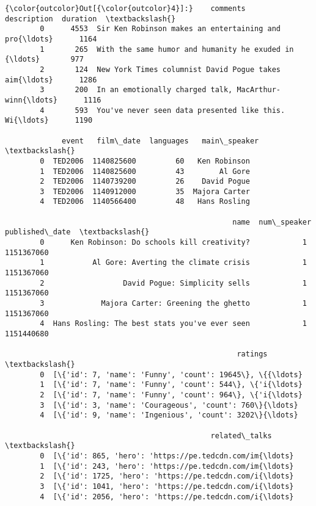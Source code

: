 \documentclass[11pt]{article}
\begin{document}
\begin{Verbatim}[commandchars=\\\{\}]
{\color{outcolor}Out[{\color{outcolor}4}]:}    comments                                        description  duration  \textbackslash{}
        0      4553  Sir Ken Robinson makes an entertaining and pro{\ldots}      1164   
        1       265  With the same humor and humanity he exuded in {\ldots}       977   
        2       124  New York Times columnist David Pogue takes aim{\ldots}      1286   
        3       200  In an emotionally charged talk, MacArthur-winn{\ldots}      1116   
        4       593  You've never seen data presented like this. Wi{\ldots}      1190   
        
             event   film\_date  languages   main\_speaker  \textbackslash{}
        0  TED2006  1140825600         60   Ken Robinson   
        1  TED2006  1140825600         43        Al Gore   
        2  TED2006  1140739200         26    David Pogue   
        3  TED2006  1140912000         35  Majora Carter   
        4  TED2006  1140566400         48   Hans Rosling   
        
                                                    name  num\_speaker  published\_date  \textbackslash{}
        0      Ken Robinson: Do schools kill creativity?            1      1151367060   
        1           Al Gore: Averting the climate crisis            1      1151367060   
        2                  David Pogue: Simplicity sells            1      1151367060   
        3             Majora Carter: Greening the ghetto            1      1151367060   
        4  Hans Rosling: The best stats you've ever seen            1      1151440680   
        
                                                     ratings  \textbackslash{}
        0  [\{'id': 7, 'name': 'Funny', 'count': 19645\}, \{{\ldots}   
        1  [\{'id': 7, 'name': 'Funny', 'count': 544\}, \{'i{\ldots}   
        2  [\{'id': 7, 'name': 'Funny', 'count': 964\}, \{'i{\ldots}   
        3  [\{'id': 3, 'name': 'Courageous', 'count': 760\}{\ldots}   
        4  [\{'id': 9, 'name': 'Ingenious', 'count': 3202\}{\ldots}   
        
                                               related\_talks  \textbackslash{}
        0  [\{'id': 865, 'hero': 'https://pe.tedcdn.com/im{\ldots}   
        1  [\{'id': 243, 'hero': 'https://pe.tedcdn.com/im{\ldots}   
        2  [\{'id': 1725, 'hero': 'https://pe.tedcdn.com/i{\ldots}   
        3  [\{'id': 1041, 'hero': 'https://pe.tedcdn.com/i{\ldots}   
        4  [\{'id': 2056, 'hero': 'https://pe.tedcdn.com/i{\ldots}   
        

\end{Verbatim}
\end{document}
